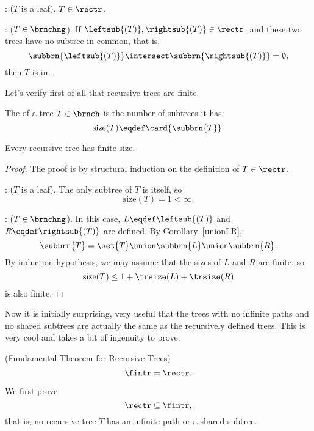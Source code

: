 \begin{definition}
\begin{definition}
: ($T$ is a leaf).  $T \in \rectr$.

: ($T \in \brnchng$).
If $\leftsub{(T)}, \rightsub{(T)} \in \rectr$, and these two trees
have no subtree in common, that is,
\[
\subbrn{\leftsub{(T)}} \intersect \subbrn{\rightsub{(T)}} = \emptyset,
\]
then $T$ is in \rectr.
\end{definition}

Let's verify first of all that recursive trees are finite.
\begin{definition}
The   of a tree $T \in \brnch$ is the
number of subtrees it has:
\begin{equation}\label{treesizedef}
\text{size}(T) \eqdef \card{\subbrn{T}}.
\end{equation}
\end{definition}

\begin{corollary}\label{cor:finitetree}
Every recursive tree has finite size.

\begin{proof}
The proof is by structural induction on the definition of $T \in
\rectr$.

: ($T$ is a leaf).  The only subtree of $T$
is itself, so
\[
\text{size}(T) = 1 < \infty.
\]

: ($T \in \brnchng$).  In this case,
$L \eqdef \leftsub{(T)}$ and $R \eqdef \rightsub{(T)}$ are defined.
By Corollary~\ref{unionLR},
\begin{equation}\label{unionTLR}
\subbrn{T} = \set{T} \union \subbrn{L} \union \subbrn{R}.
\end{equation}
By induction hypothesis, we may assume that the sizes of $L$ and $R$
are finite, so
\[
\text{size}(T) \leq 1 + \trsize(L) + \trsize(R)
\]
is also finite.
\end{proof}
\end{corollary}

Now it is initially surprising, very useful that the trees with no
infinite paths and no shared subtrees are actually the same as the
recursively defined trees.  This is very cool and takes a bit of
ingenuity to prove.

\begin{theorem}\label{fundthmrec}(Fundamental Theorem for Recursive Trees)
\[
\fintr = \rectr.
\]
\end{theorem}

We first prove
\begin{equation}\label{rectrsubfintr}
\rectr \subseteq \fintr,
\end{equation}
that is, no recursive tree $T$ has an infinite path or a shared subtree.


\end{definition}
